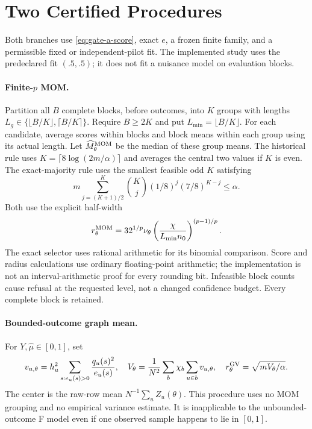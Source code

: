 \section{Two Certified Procedures}
\label{sec:method}
Both branches use \eqref{eq:gate-a-score}, exact $e$, a frozen finite family, and a permissible fixed or independent-pilot fit. The implemented study uses the predeclared fit $(.5,.5)$; it does not fit a nuisance model on evaluation blocks.

\paragraph{Finite-$p$ MOM.}
Partition all $B$ complete blocks, before outcomes, into $K$ groups with lengths $L_g\in\{\lfloor B/K\rfloor,\lceil B/K\rceil\}$. Require $B\ge2K$ and put $L_{\min}=\lfloor B/K\rfloor$. For each candidate, average scores within blocks and block means within each group using its actual length. Let $\widehat M_\theta^{\rm MOM}$ be the median of these group means. The historical rule uses $K=\lceil8\log(2m/\alpha)\rceil$ and averages the central two values if $K$ is even. The exact-majority rule uses the smallest feasible odd $K$ satisfying
\begin{equation}
 m\sum_{j=(K+1)/2}^{K}{K\choose j}(1/8)^j(7/8)^{K-j}\le\alpha.
 \label{eq:exact-K}
\end{equation}
Both use the explicit half-width
\begin{equation}
 r_\theta^{\rm MOM}=32^{1/p}\nu_\theta
 \left(\frac{\chi}{L_{\min}n_0}\right)^{(p-1)/p}.
 \label{eq:gate-a-radius}
\end{equation}
The exact selector uses rational arithmetic for its binomial comparison. Score and radius calculations use ordinary floating-point arithmetic; the implementation is not an interval-arithmetic proof for every rounding bit. Infeasible block counts cause refusal at the requested level, not a changed confidence budget. Every complete block is retained.

\paragraph{Bounded-outcome graph mean.}
For $Y,\widehat\mu\in[0,1]$, set
\begin{equation}
 v_{u,\theta}=h_u^2\sum_{s:e_u(s)>0}\frac{q_u(s)^2}{e_u(s)},\quad
 V_\theta=\frac1{N^2}\sum_b\chi_b\sum_{u\in b}v_{u,\theta},\quad
 r_\theta^{\rm GV}=\sqrt{mV_\theta/\alpha}.
 \label{eq:graph-radius}
\end{equation}
The center is the raw-row mean $N^{-1}\sum_uZ_u(\theta)$. This procedure uses no MOM grouping and no empirical variance estimate. It is inapplicable to the unbounded-outcome F model even if one observed sample happens to lie in $[0,1]$.

